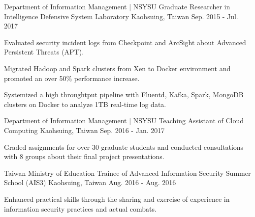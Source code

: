 


\begin{cventries}


\cventry
{Department of Information Management | NSYSU} %
{Graduate Researcher in Intelligence Defensive System Laboratory} %
{Kaohsuing, Taiwan} %
{Sep. 2015 - Jul. 2017} %
{ %
\begin{cvitems}
\item {Evaluated security incident logs from Checkpoint and ArcSight about Advanced Persistent Threats (APT).}
\item {Migrated Hadoop and Spark clusters from Xen to Docker environment and promoted an over 50\% performance increase.}
\item {Systemized a high throughtput pipeline with Fluentd, Kafka, Spark, MongoDB clusters on Docker to analyze 1TB real-time log data.}
\end{cvitems}
}


\cventry
{Department of Information Management | NSYSU} %
{Teaching Assistant of Cloud Computing} %
{Kaohsuing, Taiwan} %
{Sep. 2016 - Jan. 2017} %
{ %
\begin{cvitems}
\item {Graded assignments for over 30 graduate students and conducted consultations with 8 groups about their final project presentations.}
\end{cvitems}
}


\cventry
{Taiwan Ministry of Education} %
{Trainee of Advanced Information Security Summer School (AIS3)} %
{Kaohsuing, Taiwan} %
{Aug. 2016 - Aug. 2016} %
{ %
\begin{cvitems}
\item {Enhanced practical skills through the sharing and exercise of experience in information security practices and actual combats.}
\end{cvitems}
}


\end{cventries}
